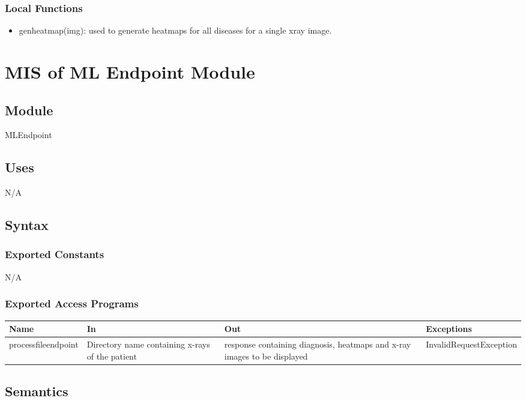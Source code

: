 \documentclass[12pt, titlepage]{article}
\begin{document}
\subsubsection{Local Functions}
\begin{itemize}
    \item genheatmap(img): used to generate heatmaps for all diseases for a single xray image.
\end{itemize}
\newpage



\section{MIS of ML Endpoint Module} \label{Module} 
\subsection{Module}
MLEndpoint
\subsection{Uses}
N/A
\subsection{Syntax}

\subsubsection{Exported Constants}
N/A
\subsubsection{Exported Access Programs}

\begin{center}
\begin{tabular}{p{3cm} p{4cm} p{4cm} p{5cm}}
\hline
\textbf{Name} & \textbf{In} & \textbf{Out} & \textbf{Exceptions} \\
\hline
processfileendpoint & Directory name containing x-rays of the patient & response containing diagnosis, heatmaps and x-ray images to be displayed & InvalidRequestException \\
\hline
\end{tabular}
\end{center}

\subsection{Semantics}
\end{document}
